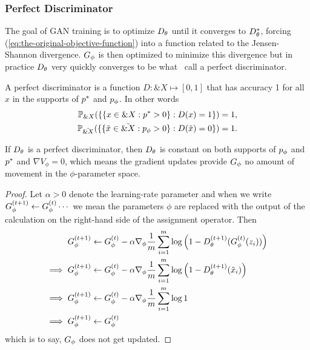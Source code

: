 
\subsubsection*{Perfect Discriminator}

The goal of GAN training is to optimize $D_\theta$ until it converges to $D_\theta^*$,
forcing (\ref{eq:the-original-objective-function}) into a function related to
the Jensen-Shannon divergence. $G_\phi$ is then optimized to minimize this
divergence but in practice $D_\theta$ very quickly converges to be
what~\cite{ref:arjovsky-towards-2017} call a perfect discriminator.

\begin{definition}%
  \label{def:perfect-discriminator}
  A \textnormal{\sffamily perfect discriminator} is a function $D: \&X \mapsto
  [0,1]$ that has accuracy 1 for all $x$ in the supports of $p^*$ and $p_{\phi}$. In
  other words
  \begin{align}
    \mathbb{P}_{\&X}(\{\{x \in \&X : p^* > 0\} : D(x) = 1 \} )= 1, \\
    \mathbb{P}_{\tilde{\&X}}(\{\{\tilde{x} \in \tilde{\&X} : p_{\phi} > 0\} : D(\tilde{x}) = 0 \} )= 1.
  \end{align}
\end{definition}

\begin{theorem}%
  \label{thm:perfect-discriminator}
  If $D_\theta$ is a perfect discriminator, then $D_\theta$ is constant on both
  supports of $p_{\phi}$ and $p^*$ and $\nabla{V_\phi} = 0$, which means
  the gradient updates provide $G_\phi$ no amount of movement in the
  $\phi$-parameter space.
\end{theorem}

\begin{proof}%
  \label{prf:perfect-discriminator}
  Let $\alpha > 0$ denote the learning-rate parameter and when we
  write $G_\phi^{(t+1)} \gets G_\phi^{(t)} \cdots$ we mean the parameters $\phi$ are replaced
  with the output of the calculation on the right-hand side of the
  assignment operator. Then
  \begin{align}
    \label{eq:g-updates-no-good}
    G_\phi^{(t+1)} & \gets G_\phi^{(t)} - \alpha\nabla_\phi {1 \over m} \sum_{i=1}^m \log\left( 1 - D_\theta^{(t+1)}(G_\phi^{(t)}(z_i)) \right) \\
    \implies G_\phi^{(t+1)} & \gets G_\phi^{(t)} - \alpha\nabla_\phi {1 \over m} \sum_{i=1}^m \log{ \left( 1 - D_\theta^{(t+1)}(\tilde{x}_i) \right)} \\
    \implies G_\phi^{(t+1)} & \gets G_\phi^{(t)} - \alpha\nabla_\phi {1 \over m} \sum_{i=1}^m \log{1} \\
    \implies G_\phi^{(t+1)} & \gets G_\phi^{(t)}
  \end{align} which is to say, $G_\phi$ does not get updated.
\end{proof}

